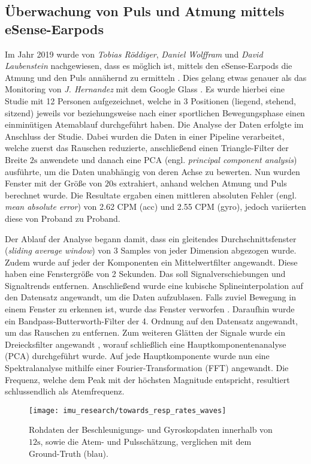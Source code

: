 \subsection{Überwachung von Puls und Atmung mittels eSense-Earpods}
Im Jahr 2019 wurde von \textit{Tobias Röddiger}, \textit{Daniel Wolffram} und \textit{David Laubenstein} nachgewiesen, dass es möglich ist, mittels den eSense-Earpods die Atmung und den Puls annähernd zu ermitteln \cite{roddigerRespirationRateMonitoring2019}. 
Dies gelang etwas genauer als das Monitoring von \textit{J. Hernandez} mit dem Google Glass \cite{hernandezCardiacRespiratoryParameter}.
Es wurde hierbei eine Studie mit 12 Personen aufgezeichnet, welche in 3 Positionen (liegend, stehend, sitzend) jeweils vor beziehungsweise nach einer sportlichen Bewegungsphase einen einminütigen Atemablauf durchgeführt haben. 
Die Analyse der Daten erfolgte im Anschluss der Studie.
Dabei wurden die Daten in einer Pipeline verarbeitet, welche zuerst das Rauschen reduzierte, anschließend einen Triangle-Filter der Breite $2\si{\s}$ anwendete und danach eine PCA (engl. \textit{principal component analysis}) ausführte, um die Daten unabhängig von deren Achse zu bewerten.
Nun wurden Fenster mit der Größe von $20\si{\s}$ extrahiert, anhand welchen Atmung und Puls berechnet wurde.
Die Resultate ergaben einen mittleren absoluten Fehler (engl. \textit{mean absolute error}) von 2.62 CPM (acc) und 2.55 CPM (gyro), jedoch variierten diese von Proband zu Proband.

Der Ablauf der Analyse begann damit, dass ein gleitendes Durchschnittsfenster (\textit{sliding average window}) von 3 Samples von jeder Dimension abgezogen wurde. 
Zudem wurde auf jeder der Komponenten ein Mittelwertfilter angewandt. 
Diese haben eine Fenstergröße von 2 Sekunden. 
Das soll Signalverschiebungen und Signaltrends entfernen.
Anschließend wurde eine kubische Splineinterpolation auf den Datensatz angewandt, um die Daten aufzublasen.
Falls zuviel Bewegung in einem Fenster zu erkennen ist, wurde das Fenster verworfen \cite{sunSleepMonitorMonitoringRespiratory2017}.
Daraufhin wurde ein Bandpass-Butterworth-Filter der 4. Ordnung auf den Datensatz angewandt, um das Rauschen zu entfernen.
Zum weiteren Glätten der Signale wurde ein Dreiecksfilter angewandt \cite{haotianMindfulWatch2017}, worauf schließlich eine Hauptkomponentenanalyse (PCA) durchgeführt wurde.
Auf jede Hauptkomponente wurde nun eine Spektralanalyse mithilfe einer Fourier-Transformation (FFT) angewandt. 
Die Frequenz, welche dem Peak mit der höchsten Magnitude entspricht, resultiert schlussendlich als Atemfrequenz.

\begin{figure}[ht]
    \texttt{[image: imu\_research/towards\_resp\_rates\_waves]}
    \caption{Rohdaten der Beschleunigungs- und Gyroskopdaten innerhalb von $12 \si{\s}$, sowie die Atem- und Pulsschätzung, verglichen mit dem Ground-Truth (blau).}
    \label{background:towards_resp_esense:results}
\end{figure}